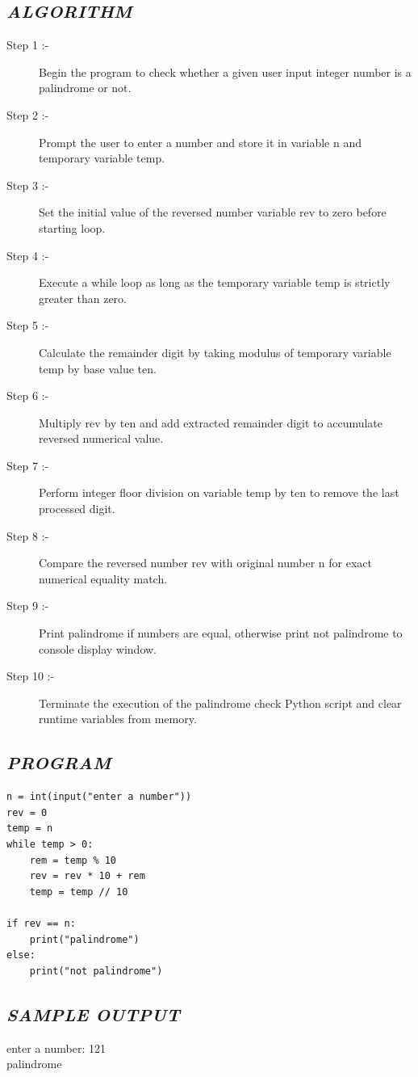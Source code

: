 \documentclass[11pt,a4paper]{article}
\begin{document}
\subsection*{\textit{ALGORITHM}}
\begin{description}
  \item[Step 1 :-] Begin the program to check whether a given user input integer number is a palindrome or not.
  \item[Step 2 :-] Prompt the user to enter a number and store it in variable n and temporary variable temp.
  \item[Step 3 :-] Set the initial value of the reversed number variable rev to zero before starting loop.
  \item[Step 4 :-] Execute a while loop as long as the temporary variable temp is strictly greater than zero.
  \item[Step 5 :-] Calculate the remainder digit by taking modulus of temporary variable temp by base value ten.
  \item[Step 6 :-] Multiply rev by ten and add extracted remainder digit to accumulate reversed numerical value.
  \item[Step 7 :-] Perform integer floor division on variable temp by ten to remove the last processed digit.
  \item[Step 8 :-] Compare the reversed number rev with original number n for exact numerical equality match.
  \item[Step 9 :-] Print palindrome if numbers are equal, otherwise print not palindrome to console display window.
  \item[Step 10 :-] Terminate the execution of the palindrome check Python script and clear runtime variables from memory.
\end{description}

\subsection*{\textit{PROGRAM}}
\begin{lstlisting}[style=pythonstyle]
n = int(input("enter a number")) 
rev = 0 
temp = n 
while temp > 0: 
    rem = temp % 10 
    rev = rev * 10 + rem 
    temp = temp // 10 

if rev == n: 
    print("palindrome") 
else: 
    print("not palindrome")
\end{lstlisting}

\subsection*{\textit{SAMPLE OUTPUT}}
\begin{tcolorbox}[colback=black!85,colframe=navyblue,title=\textbf{Terminal Output},coltitle=white,fonttitle=\bfseries\small]
\small\ttfamily\color{green!30!white}
enter a number: 121\\
palindrome
\end{tcolorbox}
\end{document}

